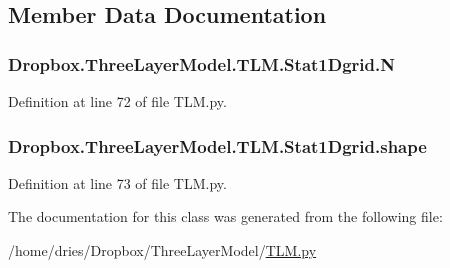 \subsection{Member Data Documentation}
\hypertarget{classDropbox_1_1ThreeLayerModel_1_1TLM_1_1Stat1Dgrid_af7e4679a087fc7d67d63e94b66d822e2}{
\subsubsection[{N}]{\setlength{\rightskip}{0pt plus 5cm}Dropbox.\+Three\+Layer\+Model.\+T\+L\+M.\+Stat1\+Dgrid.\+N}}\label{classDropbox_1_1ThreeLayerModel_1_1TLM_1_1Stat1Dgrid_af7e4679a087fc7d67d63e94b66d822e2}


Definition at line 72 of file T\+L\+M.\+py.

\hypertarget{classDropbox_1_1ThreeLayerModel_1_1TLM_1_1Stat1Dgrid_a963f61ae4d8afbb2ff9c91eaa86fd003}{
\subsubsection[{shape}]{\setlength{\rightskip}{0pt plus 5cm}Dropbox.\+Three\+Layer\+Model.\+T\+L\+M.\+Stat1\+Dgrid.\+shape}}\label{classDropbox_1_1ThreeLayerModel_1_1TLM_1_1Stat1Dgrid_a963f61ae4d8afbb2ff9c91eaa86fd003}


Definition at line 73 of file T\+L\+M.\+py.



The documentation for this class was generated from the following file\+:\begin{DoxyCompactItemize}
\item 
/home/dries/\+Dropbox/\+Three\+Layer\+Model/\hyperlink{TLM_8py}{T\+L\+M.\+py}\end{DoxyCompactItemize}
